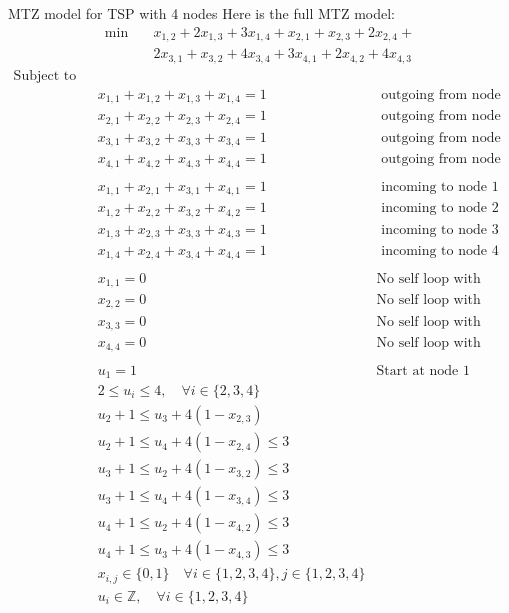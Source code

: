\begin{example}{MTZ model for TSP with 4 nodes}{}
Here is the full MTZ model:
\begin{align*}\min\quad & x_{1,2} + 2 x_{1,3} + 3 x_{1,4} + x_{2,1} + x_{2,3} + 2 x_{2,4} + \\ &2 x_{3,1} + x_{3,2} + 4 x_{3,4} + 3 x_{4,1} + 2 x_{4,2} + 4 x_{4,3}
\end{align*}
\begin{align*}
\text{Subject to} \quad \\
 & x_{1,1} + x_{1,2} + x_{1,3} + x_{1,4} = 1& \text{ outgoing from node 1}\\
  & x_{2,1} + x_{2,2} + x_{2,3} + x_{2,4} = 1& \text{ outgoing from node 2}\\
 & x_{3,1} + x_{3,2} + x_{3,3} + x_{3,4} = 1& \text{ outgoing from node 3}\\
 & x_{4,1} + x_{4,2} + x_{4,3} + x_{4,4} = 1& \text{ outgoing from node 4}\\
 \\
  & x_{1,1} + x_{2,1} + x_{3,1} + x_{4,1} = 1& \text{ incoming to node 1}\\
 & x_{1,2} + x_{2,2} + x_{3,2} + x_{4,2} = 1& \text{ incoming to node 2}\\
 & x_{1,3} + x_{2,3} + x_{3,3} + x_{4,3} = 1& \text{ incoming to node 3}\\ 
 & x_{1,4} + x_{2,4} + x_{3,4} + x_{4,4} = 1& \text{ incoming to node 4}\\
 \\
 & x_{1,1} = 0 & \text{No self loop with node 1}\\
 & x_{2,2} = 0& \text{No self loop with node 2}\\
 & x_{3,3} = 0& \text{No self loop with node 3}\\
 & x_{4,4} = 0& \text{No self loop with node 4}\\
 \\
 & u_{1} = 1 & \text{Start at node 1}\\
  &2  \leq u_{i} \leq 4, \quad\forall i \in \{2,3,4\}\\
 & u_{2} +1 \leq  u_{3} + 4 (1-x_{2,3})\\
 & u_{2} +1 \leq u_{4} + 4 (1-x_{2,4}) \leq 3\\
 & u_{3} +1 \leq u_{2} + 4 (1-x_{3,2}) \leq 3\\
 & u_{3} +1 \leq u_{4} + 4 (1-x_{3,4}) \leq 3\\
 & u_{4} +1 \leq u_{2} + 4 (1-x_{4,2}) \leq 3\\
 & u_{4} +1 \leq u_{3} + 4 (1-x_{4,3}) \leq 3\\
 & x_{i,j} \in \{0,1\} \quad\forall i\in \{1,2,3,4\}, j \in \{1,2,3,4\}\\
 & u_{i} \in \mathbb{Z}, \quad\forall i \in \{1,2,3,4\}\\
\end{align*}
\end{example}


